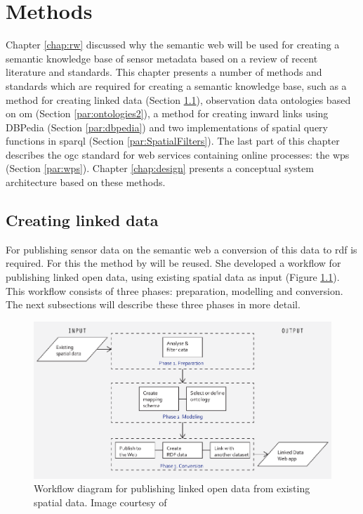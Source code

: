 


\chapter{Methods}
\label{chap:methods}

Chapter \ref{chap:rw} discussed why the semantic web will be used for creating a semantic knowledge base of sensor metadata based on a review of recent literature and standards. This chapter presents a number of methods and standards which are required for creating a semantic knowledge base, such as a method for creating linked data (Section \ref{par:missier}), observation data ontologies based on \ac{om} (Section \ref{par:ontologies2}), a method for creating inward links using DBPedia (Section \ref{par:dbpedia}) and two implementations of spatial query functions in \ac{sparql} (Section \ref{par:SpatialFilters}). The last part of this chapter describes the \ac{ogc} standard for web services containing online processes: the \acf{wps} (Section \ref{par:wps}). Chapter \ref{chap:design} presents a conceptual system architecture based on these methods. 

\section{Creating linked data}
\label{par:missier}
For publishing sensor data on the semantic web a conversion of this data to \ac{rdf} is required. For this the method by \cite{LD:Missier} will be reused. She developed a workflow for publishing linked open data, using existing spatial data as input (Figure \ref{fig:missier}). This workflow consists of three phases: preparation, modelling and conversion. The next subsections will describe these three phases in more detail.

\begin{figure}
	\centering
	\includegraphics[width=1\linewidth]{UML/workflowMissier.png}
	\caption{Workflow diagram for publishing linked open data from existing spatial data. Image courtesy of \citep[p. 28]{LD:Missier}}
	\label{fig:missier}
\end{figure}

